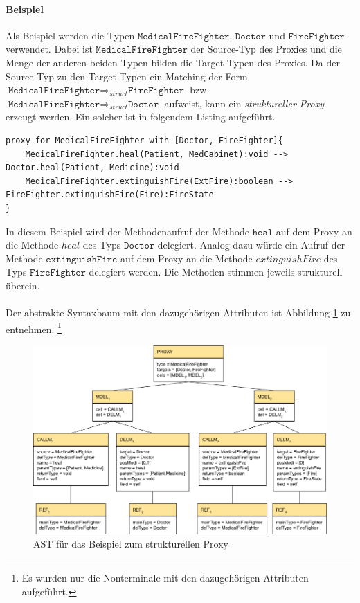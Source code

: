 \documentclass[a4paper,12pt]{article}
\begin{document}
\paragraph{Beispiel}
Als Beispiel werden die Typen $\texttt{MedicalFireFighter}$, $\texttt{Doctor}$ und $\texttt{FireFighter}$ verwendet. Dabei ist $\texttt{MedicalFireFighter}$ der Source-Typ des Proxies und die Menge der anderen beiden Typen bilden die Target-Typen des Proxies. Da der Source-Typ zu den Target-Typen ein Matching der Form $\texttt{MedicalFireFighter} \Rightarrow_{struct} \texttt{FireFighter}$ bzw. $\texttt{MedicalFireFighter} \Rightarrow_{struct} \texttt{Doctor}$ aufweist, kann ein \emph{struktureller Proxy} erzeugt werden. Ein solcher ist in folgendem Listing aufgeführt.
\begin{lstlisting}[style = dsl, caption = Struktureller Proxy für MedicalFireFighter, captionpos = b]
proxy for MedicalFireFighter with [Doctor, FireFighter]{
	MedicalFireFighter.heal(Patient, MedCabinet):void --> Doctor.heal(Patient, Medicine):void
	MedicalFireFighter.extinguishFire(ExtFire):boolean --> FireFighter.extinguishFire(Fire):FireState
}
\end{lstlisting}
In diesem Beispiel wird der Methodenaufruf der Methode $\texttt{heal}$ auf dem Proxy an die Methode $heal$ des Typs $\texttt{Doctor}$ delegiert. Analog dazu würde ein Aufruf der Methode $\texttt{extinguishFire}$ auf dem Proxy an die Methode $extinguishFire$ des Typs $\texttt{FireFighter}$ delegiert werden. Die Methoden stimmen jeweils strukturell überein.\\\\
Der abstrakte Syntaxbaum mit den dazugehörigen Attributen ist Abbildung \ref{fig:ASTSTRUCT} zu entnehmen. \footnote{Es wurden nur die Nonterminale mit den dazugehörigen Attributen aufgeführt.}
\begin{figure}[h!]
\centering
\includegraphics[width=\linewidth]{AST_StructExample}
\caption{AST für das Beispiel zum strukturellen Proxy}
\label{fig:ASTSTRUCT}
\end{figure}
\noindent
\end{document}
